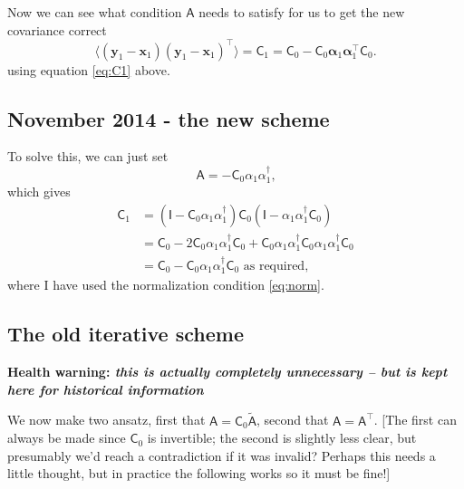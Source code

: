 \documentclass[11pt,a4paper,preprint]{aastex}
\newcommand{\bmath}[1]{\ensuremath{\bm{#1}}}
\renewcommand{\vec}[1]{\bmath{#1}}
\begin{document}
Now we can see what condition $\mathsf{A}$ needs to satisfy for us to
get the new covariance correct
\begin{equation}
\langle (\vec{y}_1-\vec{x}_1) (\vec{y}_1-\vec{x}_1)^{\top} \rangle =
\mathsf{C}_1 =
\mathsf{C}_0 - \mathsf{C}_0 \vec{\alpha}_1 \vec{\alpha}_1^{\top} \mathsf{C}_0
\textrm{.}
\end{equation}
using equation \eqref{eq:C1} above.

\subsection{November 2014 - the new scheme}

To solve this, we can just set
\begin{equation}
\mathsf{A} = - \mathsf{C}_0 \alpha_1 \alpha_1^{\dagger}\textrm{,}
\end{equation}
which gives
\begin{align}
\mathsf{C}_1 & = (\mathsf{I} - \mathsf{C}_0 \alpha_1
\alpha_1^{\dagger}) \mathsf{C}_0  (\mathsf{I} - \alpha_1
\alpha_1^{\dagger} \mathsf{C}_0 ) \\
& = \mathsf{C}_0 - 2 \mathsf{C}_0 \alpha_1 \alpha_1^{\dagger}
\mathsf{C}_0 + \mathsf{C}_0 \alpha_1 \alpha_1^{\dagger}
\mathsf{C}_0 \alpha_1 \alpha_1^{\dagger}
\mathsf{C}_0  \\
& = \mathsf{C}_0 - \mathsf{C}_0 \alpha_1 \alpha_1^{\dagger}
\mathsf{C}_0\textrm{ as required,}
\end{align}
where I have used the normalization condition \eqref{eq:norm}.

\subsection{The old iterative scheme}

{\bf Health warning: \it this is actually completely unnecessary -- but is kept here for
  historical information}

 We now make two ansatz, first that
$\mathsf{A} = \mathsf{C}_0 \tilde{\mathsf{A}}$, second that $\mathsf{A} =
\mathsf{A}^{\top}$. [The first can always be made since $\mathsf{C}_0$
is invertible; the second is slightly less clear, but presumably we'd
reach a contradiction if it was invalid? Perhaps this needs a little
thought, but in practice the following works so it must be fine!]
\end{document}
